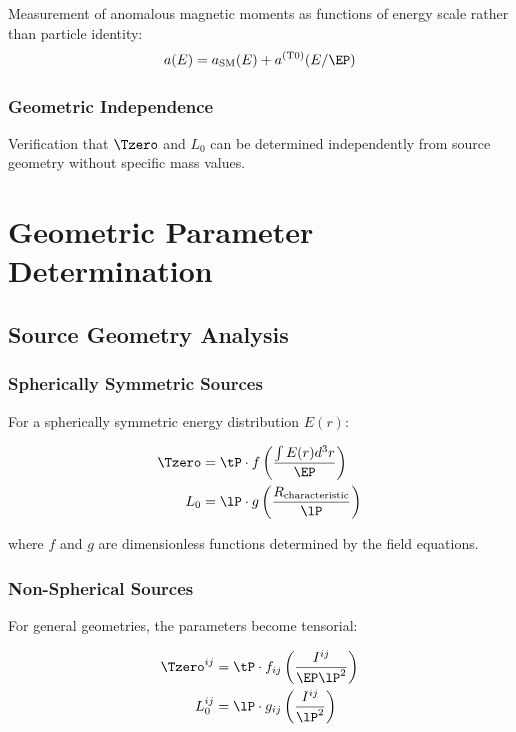 	Measurement of anomalous magnetic moments as functions of energy scale rather than particle identity:
	\begin{equation}
		a(E) = a_{\text{SM}}(E) + a^{(\text{T0})}(E/\EP)
		\label{eq:energy_dependent_anomaly}
	\end{equation}
	
	\subsubsection{Geometric Independence}
	
	Verification that $\Tzero$ and $L_0$ can be determined independently from source geometry without specific mass values.
	
	\section{Geometric Parameter Determination}
	\label{sec:geometric_parameters}
	
	\subsection{Source Geometry Analysis}
	\label{subsec:source_geometry}
	
	\subsubsection{Spherically Symmetric Sources}
	
	For a spherically symmetric energy distribution $E(r)$:
	
	\begin{align}
		\Tzero &= \tP \cdot f\left(\frac{\int E(r) d^3r}{\EP}\right) \\
		L_0 &= \lP \cdot g\left(\frac{R_{\text{characteristic}}}{\lP}\right)
	\end{align}
	
	where $f$ and $g$ are dimensionless functions determined by the field equations.
	
	\subsubsection{Non-Spherical Sources}
	
	For general geometries, the parameters become tensorial:
	
	\begin{align}
		\Tzero^{ij} &= \tP \cdot f_{ij}\left(\frac{I^{ij}}{\EP \lP^2}\right) \\
		L_0^{ij} &= \lP \cdot g_{ij}\left(\frac{I^{ij}}{\lP^2}\right)
	\end{align}
	
